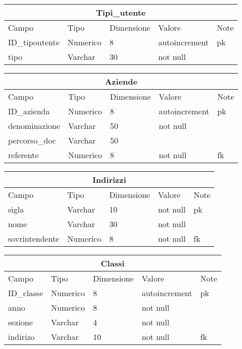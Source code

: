\documentclass[12pt]{article}
\begin{document}
\begin{center}
    \bigskip
    \begin{tabular}{|p{3.0cm}||p{1.6cm}|p{2cm}|p{2.5cm}|p{1cm}|}
        \hline
        \multicolumn{5}{|c|}{Tipi\_utente} \\
        \hline
        Campo & Tipo & Dimensione & Valore & Note \\
        \hline
        ID\_tipoutente & Numerico & 8 & autoincrement & pk \\
        \hline
        tipo & Varchar & 30 & not null &  \\
        \hline
    \end{tabular}
    
    \bigskip
    \begin{tabular}{|p{3.0cm}||p{1.6cm}|p{2cm}|p{2.5cm}|p{1cm}|}
        \hline
        \multicolumn{5}{|c|}{Aziende} \\
        \hline
        Campo & Tipo & Dimensione & Valore & Note \\
        \hline
        ID\_azienda & Numerico & 8 & autoincrement & pk \\
        \hline
        denominazione & Varchar & 50 & not null &  \\
        \hline
        percorso\_doc & Varchar & 50 &  &  \\
        \hline
        referente & Numerico & 8 & not null & fk \\
        \hline
    \end{tabular}
    
    \bigskip
    \begin{tabular}{|p{3.0cm}||p{1.6cm}|p{2cm}|p{2.5cm}|p{1cm}|}
        \hline
        \multicolumn{5}{|c|}{Indirizzi} \\
        \hline
        Campo & Tipo & Dimensione & Valore & Note \\
        \hline
        sigla & Varchar & 10 & not null & pk \\
        \hline
        nome & Varchar & 30 & not null &  \\
        \hline
        sovrintendente & Numerico & 8 & not null & fk \\
        \hline
    \end{tabular}
    
    \bigskip
    \begin{tabular}{|p{3.0cm}||p{1.6cm}|p{2cm}|p{2.5cm}|p{1cm}|}
        \hline
        \multicolumn{5}{|c|}{Classi} \\
        \hline
        Campo & Tipo & Dimensione & Valore & Note \\
        \hline
        ID\_classe & Numerico & 8 & autoincrement & pk \\
        \hline
        anno & Numerico & 8 & not null &  \\
        \hline
        sezione & Varchar & 4 & not null &  \\
        \hline
        indirizo & Varchar & 10 & not null & fk \\
        \hline
    \end{tabular}
\end{center}
\end{document}
